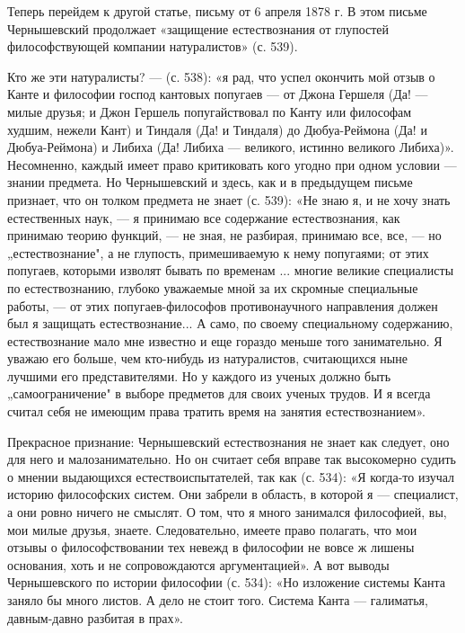 Теперь перейдем  к другой статье,  письму от 6  апреля 1878 г.  В этом
письме Чернышевский продолжает  «защищение естествознания от глупостей
философствующей компании натуралистов» (с. 539).

Кто же эти  натуралисты? --- (с. 538): «я рад,  что успел окончить мой
отзыв  о Канте  и  философии  господ кантовых  попугаев  --- от  Джона
Гершеля (Да! --- милые друзья;  и Джон Гершель попугайствовал по Канту
или  философам худшим,  нежели  Кант)  и Тиндаля  (Да!  и Тиндаля)  до
Дюбуа-Реймона (Да! и Дюбуа-Реймона) и Либиха (Да! Либиха --- великого,
истинно великого Либиха)». Несомненно,  каждый имеет право критиковать
кого угодно при  одном условии --- знании предмета.  Но Чернышевский и
здесь, как и  в предыдущем письме признает, что он  толком предмета не
знает (с. 539): «Не  знаю я, и не хочу знать  естественных наук, --- я
принимаю все  содержание естествознания, как принимаю  теорию функций,
--- не зная, не разбирая,  принимаю все, все, --- но „естествознание",
а  не глупость,  примешиваемую  к нему  попугаями;  от этих  попугаев,
которыми изволят бывать по временам  ... многие великие специалисты по
естествознанию,  глубоко уважаемые  мной  за  их скромные  специальные
работы,  --- от  этих  попугаев-философов противонаучного  направления
должен был я защищать естествознание... А само, по своему специальному
содержанию, естествознание мало мне известно и еще гораздо меньше того
занимательно.  Я уважаю  его больше,  чем кто-нибудь  из натуралистов,
считающихся ныне лучшими  его представителями. Но у  каждого из ученых
должно  быть „самоограничение"  в  выборе предметов  для своих  ученых
трудов.  И я  всегда считал  себя не  имеющим права  тратить время  на
занятия естествознанием».

Прекрасное  признание:   Чернышевский  естествознания  не   знает  как
следует, оно  для него и  малозанимательно. Но он считает  себя вправе
так высокомерно  судить о  мнении выдающихся  естествоиспытателей, так
как  (с. 534):  «Я  когда-то изучал  историю  философских систем.  Они
забрели в область,  в которой я --- специалист, а  они ровно ничего не
смыслят.  О том,  что  я  много занимался  философией,  вы, мои  милые
друзья, знаете. Следовательно, имеете право полагать, что мои отзывы о
философствовании тех невежд  в философии не вовсе  ж лишены основания,
хоть и не сопровождаются аргументацией». А вот выводы Чернышевского по
истории  философии (с.  534): «Но  изложение системы  Канта заняло  бы
много  листов. А  дело не  стоит  того. Система  Канта ---  галиматья,
давным-давно разбитая в прах».

